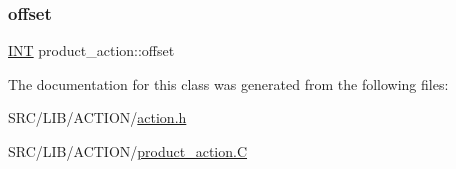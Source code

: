 \mbox{\label{classproduct__action_ae96c015ad5b35f847209afc87d728f11}} 
\subsubsection{\texorpdfstring{offset}{offset}}
{\footnotesize\ttfamily \mbox{\hyperlink{galois_8h_a09fddde158a3a20bd2dcadb609de11dc}{I\+NT}} product\+\_\+action\+::offset}



The documentation for this class was generated from the following files\+:\begin{DoxyCompactItemize}
\item 
S\+R\+C/\+L\+I\+B/\+A\+C\+T\+I\+O\+N/\mbox{\hyperlink{action_8h}{action.\+h}}\item 
S\+R\+C/\+L\+I\+B/\+A\+C\+T\+I\+O\+N/\mbox{\hyperlink{product__action_8_c}{product\+\_\+action.\+C}}\end{DoxyCompactItemize}
